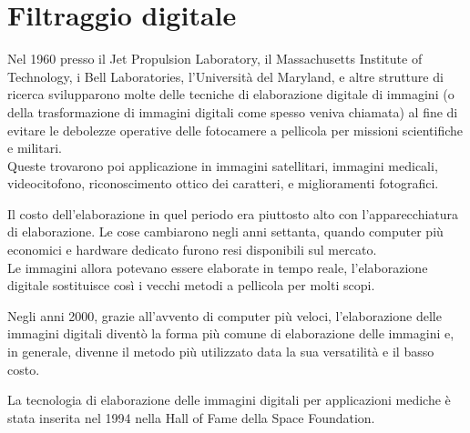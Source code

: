 \section{Filtraggio digitale}
Nel 1960 presso il Jet Propulsion Laboratory, il Massachusetts Institute of Technology, i Bell Laboratories, l'Università del Maryland, e altre strutture di ricerca svilupparono molte delle tecniche di elaborazione digitale di immagini (o della trasformazione di immagini digitali come spesso veniva chiamata) al fine di evitare le debolezze operative delle fotocamere a pellicola per missioni scientifiche e militari.\\
Queste trovarono poi applicazione in immagini satellitari, immagini medicali, videocitofono, riconoscimento ottico dei caratteri, e miglioramenti fotografici.

Il costo dell'elaborazione in quel periodo era piuttosto alto con l'apparecchiatura di elaborazione. Le cose cambiarono negli anni settanta, quando computer più economici e hardware dedicato furono resi disponibili sul mercato.\\
Le immagini allora potevano essere elaborate in tempo reale, l'elaborazione digitale sostituisce così i vecchi metodi a pellicola per molti scopi.

\vspace{1em} \noindent
Negli anni 2000, grazie all'avvento di computer più veloci, l'elaborazione delle immagini digitali diventò la forma più comune di elaborazione delle immagini e, in generale, divenne il metodo più utilizzato data la sua versatilità e il basso costo.

La tecnologia di elaborazione delle immagini digitali per applicazioni mediche è stata inserita nel 1994 nella Hall of Fame della Space Foundation.


